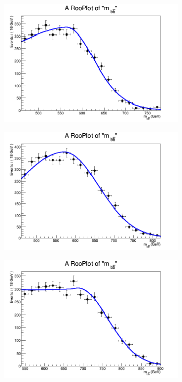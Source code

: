\begin{figure}[phtb!]
\begin{center}
  \begin{subfigure}[$m_{A}=650$ GeV]{0.4\textwidth}\includegraphics[width=\textwidth]{FitResults/images/fitMC_bAbb650_3.png}\end{subfigure}
  \begin{subfigure}[$m_{A}=700$ GeV]{0.4\textwidth}\includegraphics[width=\textwidth]{FitResults/images/fitMC_bAbb700_3.png}\end{subfigure}
  \begin{subfigure}[$m_{A}=800$ GeV]{0.4\textwidth}\includegraphics[width=\textwidth]{FitResults/images/fitMC_bAbb800_3.png}\end{subfigure}

\end{center}
\end{figure}

